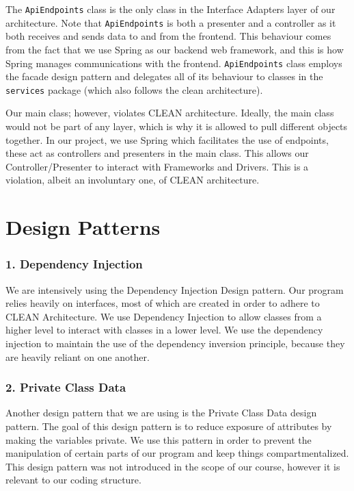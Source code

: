 \documentclass[fontsize=14pt]{article}
\def\code#1{\texttt{#1}}
\begin{document}
The \code{ApiEndpoints} class is the only class in the Interface Adapters layer of our architecture. Note that \code{ApiEndpoints} is both a presenter and a controller as it both receives and sends data to and from the frontend. This behaviour comes from the fact that we use Spring as our backend web framework, and this is how Spring manages communications with the frontend. \code{ApiEndpoints} class employs the facade design pattern and delegates all of its behaviour to classes in the \code{services} package (which also follows the clean architecture).


Our main class; however, violates CLEAN architecture. Ideally, the main class would not be part of any layer, which is why it is allowed to pull different objects together. In our project, we use Spring which facilitates the use of endpoints, these act as controllers and presenters in the main class. This allows our Controller/Presenter to interact with Frameworks and Drivers. This is a violation, albeit an involuntary one, of CLEAN architecture.  

\section*{Design Patterns}

\subsubsection*{1. Dependency Injection}
We are intensively using the Dependency Injection Design pattern. Our program relies heavily on interfaces, most of which are created in order to adhere to CLEAN Architecture. We use Dependency Injection to allow classes from a higher level to interact with classes in a lower level. We use the dependency injection to maintain the use of the dependency inversion principle, because they are heavily reliant on one another.

\subsubsection*{2. Private Class Data}
Another design pattern that we are using is the Private Class Data design pattern. The goal of this design pattern is to reduce exposure of attributes by making the variables private. We use this pattern in order to prevent the manipulation of certain parts of our program and keep things compartmentalized. This design pattern was not introduced in the scope of our course, however it is relevant to our coding structure. %
\end{document}
